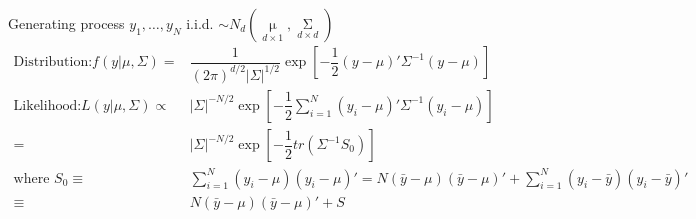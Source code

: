 Generating process $ y_1,\ldots,y_N $ i.i.d. $ \sim N_d(\mathop{\mu }\limits_{d\times 1}  ,\mathop{\Sigma }\limits_{d\times d} ) $
\begin{align}
    \text{Distribution:}f(y|\mu ,\Sigma )=&\dfrac{1}{(2\pi)^{d/2}|\Sigma |^{1/2}}\exp\left[ -\dfrac{1}{2}(y-\mu )'\Sigma ^{-1}(y-\mu ) \right]\\
    \text{Likelihood:}L(y|\mu ,\Sigma )\propto& |\Sigma |^{-N/2}\exp\left[ -\dfrac{1}{2}\sum_{i=1}^N (y_i-\mu )'\Sigma ^{-1}(y_i-\mu ) \right]\\
    =& |\Sigma |^{-N/2}\exp\left[ -\dfrac{1}{2}tr\left(\Sigma ^{-1}S_0
     \right)\right]\\
    \text{where }S_0\equiv &\sum_{i=1}^N(y_i-\mu )(y_i-\mu )'=N(\bar{y}-\mu )(\bar{y}-\mu )'+\sum_{i=1}^N(y_i-\bar{y})(y_i-\bar{y})'\\
    \equiv& N(\bar{y}-\mu )(\bar{y}-\mu )'+S
\end{align}


